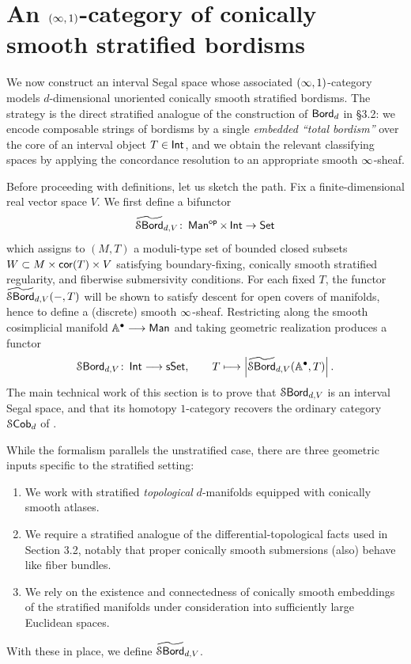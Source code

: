 \chapter{An \texorpdfstring{$(\operatorname{\infty},1)$}--category of conically smooth stratified bordisms}

We now construct an interval Segal space whose associated $(\operatorname{\infty},1)$-category models $d$-dimensional unoriented conically smooth stratified bordisms. The strategy is the direct stratified
analogue of the construction of $\operatorname{\mathsf{Bord}}_d$ in \S3.2: we encode composable strings of bordisms by a single \emph{embedded ``total bordism''} over the core of an interval object $T\in \operatorname{\mathsf{Int}}$, and we obtain the relevant classifying spaces by applying the concordance resolution to an appropriate smooth $\operatorname{\infty}$-sheaf.

Before proceeding with definitions, let us sketch the path. Fix a finite-dimensional real vector space $V$. We first define a bifunctor
\begin{equation}
\operatorname{\widetilde{\mathcal S\mathsf{Bord}}}_{d,V}\colon \operatorname{\sf Man}^{\mathsf{op}}\times \operatorname{\mathsf{Int}} \to \operatorname{{\mathsf{Set}}}
\end{equation}
which assigns to $(M,T)$ a moduli-type set of bounded closed subsets
$W\subset M\times \operatorname{{\sf cor}}(T)\times V$ satisfying boundary-fixing, conically smooth stratified regularity, and fiberwise submersivity conditions. For each fixed $T$, the functor $\operatorname{\widetilde{\mathcal S\mathsf{Bord}}}_{d,V}(-,T)$ will be shown to satisfy descent for open covers of manifolds, hence to define a (discrete) smooth $\operatorname{\infty}$-sheaf. Restricting along the smooth cosimplicial manifold $\mathbb A^{\bullet} \longrightarrow \operatorname{\sf Man}$ and taking geometric realization produces a functor
\begin{equation}
\operatorname{\mathcal S\mathsf{Bord}}_{d,V}\colon \operatorname{\mathsf{Int}} \longrightarrow \operatorname{\sf sSet}, \qquad
T \longmapsto \left|\operatorname{\widetilde{\mathcal S\mathsf{Bord}}}_{d,V}(\mathbb A^\bullet,T) \right|.
\end{equation}
The main technical work of this section is to prove that $\operatorname{\mathcal S\mathsf{Bord}}_{d,V}$ is an interval Segal space, and that its homotopy $1$-category recovers the ordinary category $\mathcal S\mathsf{Cob}_d$ of .

While the formalism parallels the unstratified case, there are three geometric inputs specific to the
stratified setting: 
\begin{enumerate}
    \item We work with stratified \emph{topological} $d$-manifolds equipped with conically smooth atlases. 
    \item We require a stratified analogue of the differential-topological facts used in Section 3.2, notably that proper conically smooth submersions (also) behave like fiber bundles. 
    \item We rely on the existence and connectedness of conically smooth embeddings of the stratified manifolds under consideration into sufficiently large Euclidean spaces. 
\end{enumerate}
With these in place, we define $\operatorname{\widetilde{\mathcal S\mathsf{Bord}}}_{d,V}$. 



